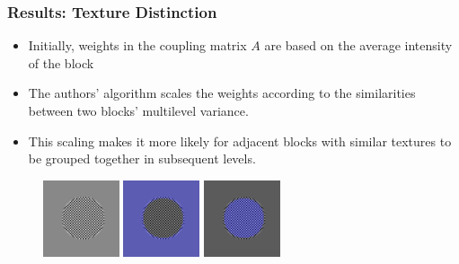 \documentclass[8pt]{beamer}
\begin{document}
\begin{frame}
\frametitle{Results: Texture Distinction}
\begin{itemize}
\item Initially, weights in the coupling matrix $A$ are based on the average intensity of the block
\item The authors' algorithm scales the weights according to the similarities between two blocks' multilevel variance.
\item This scaling makes it more likely for adjacent blocks with similar textures to be grouped together in subsequent levels.
\end{itemize}

\begin{figure}
\centering
\includegraphics[width=0.2\textwidth,height=0.2\textwidth]{checker_disk_60.png} \hspace{.45cm}
\includegraphics[width=0.2\textwidth,height=0.2\textwidth]{checker_disk_good_seg_1.png} \hspace{.45cm}
\includegraphics[width=0.2\textwidth,height=0.2\textwidth]{checker_disk_good_seg_2.png}
\end{figure}

\end{frame}
\end{document}
